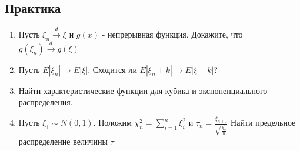 \documentclass[a4paper, 14pt]{extarticle}
\begin{document}
\subsection*{Практика}
\begin{enumerate}

\item Пусть $\xi_n \overset{d}{\to} \xi$ и $g(x)$ - непрерывная функция. Докажите, что $g(\xi_n) \overset{d}{\to} g(\xi)$

\item Пусть $E|\xi_n| \to E|\xi|$. Сходится ли $E|\xi_n + k| \to E|\xi+k|$?

\item Найти характеристические функции для кубика и экспоненциального распределения.

\item Пусть $\xi_1 \sim N(0,1)$. Положим $\chi_n^2 = \sum_{i=1}^{n}\xi_i^2$ и $\tau_n = \frac{\xi_{n+1}}{\sqrt{\frac{\chi_n^2}{n}}}$
Найти предельное распределение величины $\tau$

\end{enumerate}
\newpage
\end{document}
